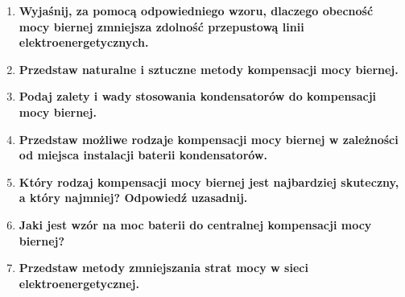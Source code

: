 \documentclass[12pt]{article}
\newcommand{\pytanie}[1]{\item \textbf{#1}}
\begin{document}
\begin{enumerate}
	\pytanie{Wyjaśnij, za pomocą odpowiedniego wzoru, dlaczego obecność mocy biernej 
	zmniejsza zdolność przepustową linii elektroenergetycznych.}
	
	\pytanie{Przedstaw naturalne i sztuczne metody kompensacji mocy biernej.}
	
	\pytanie{Podaj zalety i wady stosowania kondensatorów do kompensacji mocy biernej.}
	
	\pytanie{Przedstaw możliwe rodzaje kompensacji mocy biernej w zależności od miejsca 
	instalacji baterii kondensatorów.}
	
	\pytanie{Który rodzaj kompensacji mocy biernej jest najbardziej skuteczny, a który 
	najmniej? Odpowiedź uzasadnij.}
	
	\pytanie{Jaki jest wzór na moc baterii do centralnej kompensacji mocy biernej?}
	
	\pytanie{Przedstaw metody zmniejszania strat mocy w sieci elektroenergetycznej.}

\end{enumerate}
\end{document}

